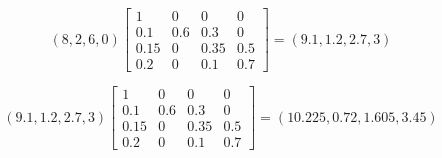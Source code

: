 \begin{frame}
$$
(8, 2, 6, 0)
\begin{bmatrix}
1 & 0 & 0 & 0\\
0.1  & 0.6 & 0.3  & 0\\
0.15 & 0   & 0.35 & 0.5\\
0.2  & 0   & 0.1  & 0.7
\end{bmatrix}
=
(9.1,1.2,2.7,3)
$$
	
$$
(9.1,1.2,2.7,3)
\begin{bmatrix}
1 & 0 & 0 & 0\\
0.1  & 0.6 & 0.3  & 0\\
0.15 & 0   & 0.35 & 0.5\\
0.2  & 0   & 0.1  & 0.7
\end{bmatrix}
=
(10.225,0.72,1.605,3.45)
$$
	
\end{frame}